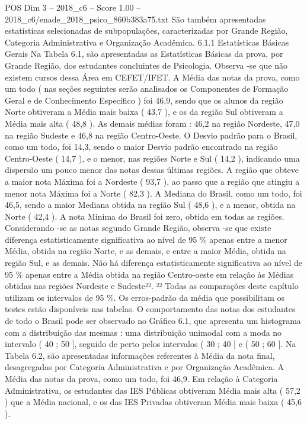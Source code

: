\begin{textsample}{POS Dim 3 – 2018\_c6 – Score 1.00 – 2018\_c6/enade\_2018\_psico\_860b383a75.txt}
São também apresentadas estatísticas selecionadas de subpopulações, caracterizadas por Grande Região, Categoria Administrativa e Organização Acadêmica. 6.1.1 Estatísticas Básicas Gerais Na Tabela 6.1, são apresentadas as Estatísticas Básicas da prova, por Grande Região, dos estudantes concluintes de Psicologia.
Observa -se que não existem cursos dessa Área em CEFET/IFET.
A Média das notas da prova, como um todo ( nas seções seguintes serão analisados os Componentes de Formação Geral e de Conhecimento Específico ) foi 46,9, sendo que os alunos da região Norte obtiveram a Média mais baixa ( 43,7 ), e os da região Sul obtiveram a Média mais alta ( 48,8 ).
As demais médias foram : 46,2 na região Nordeste, 47,0 na região Sudeste e 46,8 na região Centro-Oeste.
O Desvio padrão para o Brasil, como um todo, foi 14,3, sendo o maior Desvio padrão encontrado na região Centro-Oeste ( 14,7 ), e o menor, nas regiões Norte e Sul ( 14,2 ), indicando uma dispersão um pouco menor das notas dessas últimas regiões.
A região que obteve a maior nota Máxima foi a Nordeste ( 93,7 ), ao passo que a região que atingiu a menor nota Máxima foi a Norte ( 82,3 ).
A Mediana do Brasil, como um todo, foi 46,5, sendo a maior Mediana obtida na região Sul ( 48,6 ), e a menor, obtida na Norte ( 42,4 ).
A nota Mínima do Brasil foi zero, obtida em todas as regiões.
Considerando -se as notas segundo Grande Região, observa -se que existe diferença estatisticamente significativa ao nível de 95 \% apenas entre a menor Média, obtida na região Norte, e as demais, e entre a maior Média, obtida na região Sul, e as demais.
Não há diferença estatisticamente significativa ao nível de 95 \% apenas entre a Média obtida na região Centro-oeste em relação às Médias obtidas nas regiões Nordeste e Sudeste²². ²² Todas as comparações deste capítulo utilizam os intervalos de 95 \%.
Os erros-padrão da média que possibilitam os testes estão disponíveis nas tabelas.
O comportamento das notas dos estudantes de todo o Brasil pode ser observado no Gráfico 6.1, que apresenta um histograma com a distribuição das mesmas : uma distribuição unimodal com a moda no intervalo ( 40 ; 50 ], seguido de perto pelos intervalos ( 30 ; 40 ] e ( 50 ; 60 ].
Na Tabela 6.2, são apresentadas informações referentes à Média da nota final, desagregadas por Categoria Administrativa e por Organização Acadêmica.
A Média das notas da prova, como um todo, foi 46,9.
Em relação à Categoria Administrativa, os estudantes das IES Públicas obtiveram Média mais alta ( 57,2 ) que a Média nacional, e os das IES Privadas obtiveram Média mais baixa ( 45,6 ).

\end{textsample}
